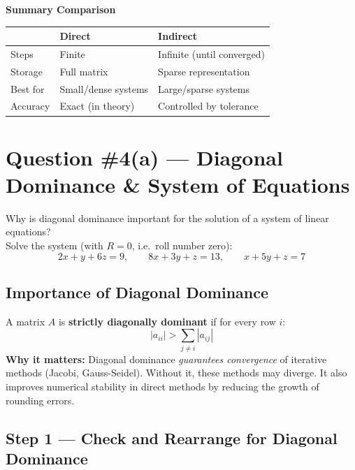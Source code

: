 \documentclass[12pt]{article}
\begin{document}
\begin{formulabox}
\textbf{Summary Comparison}\\[4pt]
\begin{tabular}{p{4cm} p{4cm} p{4cm}}
\hline
 & \textbf{Direct} & \textbf{Indirect} \\
\hline
Steps & Finite & Infinite (until converged) \\
Storage & Full matrix & Sparse representation \\
Best for & Small/dense systems & Large/sparse systems \\
Accuracy & Exact (in theory) & Controlled by tolerance \\
\hline
\end{tabular}
\end{formulabox}

\newpage

\section{Question \#4(a) --- Diagonal Dominance \& System of Equations}

\begin{problembox}
Why is diagonal dominance important for the solution of a system of linear equations?\\
Solve the system (with $R = 0$, i.e.\ roll number zero):
\[
  2x + y + 6z = 9, \qquad 8x + 3y + z = 13, \qquad x + 5y + z = 7
\]
\end{problembox}

\subsection*{Importance of Diagonal Dominance}

\begin{conceptbox}
A matrix $A$ is \textbf{strictly diagonally dominant} if for every row $i$:
\[
  |a_{ii}| > \sum_{j \neq i} |a_{ij}|
\]
\textbf{Why it matters:} Diagonal dominance \emph{guarantees convergence} of iterative methods (Jacobi, Gauss-Seidel). Without it, these methods may diverge. It also improves numerical stability in direct methods by reducing the growth of rounding errors.
\end{conceptbox}

\subsection*{Step 1 --- Check and Rearrange for Diagonal Dominance}
\end{document}
